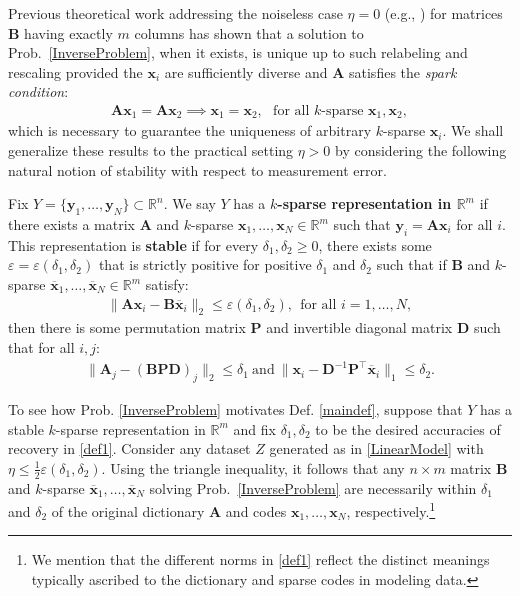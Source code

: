 Previous theoretical work addressing the noiseless case $\eta =0$ (e.g., \cite{li2004analysis, Georgiev05, Aharon06, Hillar15}) for matrices $\mathbf{B}$ having exactly $m$ columns has shown that a solution to Prob.~\ref{InverseProblem}, when it exists, is unique up to such relabeling and rescaling provided the $\mathbf{x}_i$ are sufficiently diverse and $\mathbf{A}$ satisfies the \textit{spark condition}:
\begin{align}\label{SparkCondition}
\mathbf{A}\mathbf{x}_1 = \mathbf{A}\mathbf{x}_2 \implies \mathbf{x}_1 = \mathbf{x}_2, \ \ \ \text{for all $k$-sparse } \mathbf{x}_1, \mathbf{x}_2,
\end{align}
%
which is necessary to guarantee the uniqueness of arbitrary $k$-sparse $\mathbf{x}_i$. We shall generalize these results to the practical setting  $\eta > 0$ by considering the following natural notion of stability with respect to measurement error.


\begin{definition}\label{maindef}
Fix $Y = \{ \mathbf{y}_1, \ldots, \mathbf{y}_N\} \subset \mathbb{R}^n$. We say $Y$ has a \textbf{$k$-sparse representation in $\mathbb{R}^m$} if there exists a matrix $\mathbf{A}$ and $k$-sparse $\mathbf{x}_1, \ldots, \mathbf{x}_N \in \mathbb{R}^m$ such that $\mathbf{y}_i = \mathbf{A}\mathbf{x}_i$ for all $i$. 
This representation is \textbf{stable} if for every $\delta_1, \delta_2 \geq 0$, there exists some $\varepsilon = \varepsilon(\delta_1, \delta_2)$ that is strictly positive for positive $\delta_1$ and $\delta_2$ such that if $\mathbf{B}$ and $k$-sparse $\mathbf{\overline x}_1, \ldots, \mathbf{\overline x}_N \in \mathbb{R}^m$ satisfy:
\begin{align*}
	\|\mathbf{A}\mathbf{x}_i - \mathbf{B}\mathbf{\overline x}_i\|_2 \leq \varepsilon(\delta_1, \delta_2),\ \   \text{for all $i=1,\ldots,N$},
\end{align*}
then there is some permutation matrix $\mathbf{P}$ and invertible diagonal matrix $\mathbf{D}$ such that for all $i, j$:
\begin{align}\label{def1}
\|\mathbf{A}_j - (\mathbf{BPD})_j\|_2 \leq \delta_1 \ \text{and} \ \|\mathbf{x}_i - \mathbf{D}^{-1}\mathbf{P}^{\top}\mathbf{\overline x}_i\|_1 \leq \delta_2.
\end{align}
\end{definition}

To see how Prob. \ref{InverseProblem} motivates Def. \ref{maindef}, suppose that $Y$ has a stable $k$-sparse representation in $\mathbb{R}^m$ and fix $\delta_1, \delta_2$ to be the desired accuracies of recovery in \eqref{def1}. Consider any dataset $Z$ generated as in \eqref{LinearModel} with $\eta \leq \frac{1}{2} \varepsilon(\delta_1, \delta_2)$. Using the triangle inequality, it follows that any $n \times m$ matrix $\mathbf{B}$ and $k$-sparse $\mathbf{\overline x}_1, \ldots, \mathbf{\overline x}_N$ solving Prob.~\ref{InverseProblem} are necessarily within $\delta_1$ and $\delta_2$ of the original dictionary $\mathbf{A}$ and codes $\mathbf{x}_1, \ldots, \mathbf{x}_N$, respectively.\footnote{We mention that the different norms in \eqref{def1} reflect the distinct meanings typically ascribed to the dictionary and sparse codes in modeling data.}

